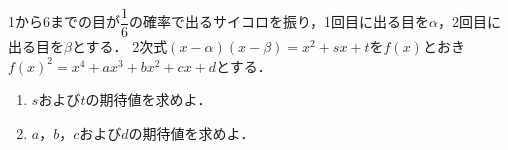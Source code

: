 \documentclass[../../main.tex]{subfiles}
\begin{document}
1から6までの目が$\displaystyle\dfrac{1}{6}$の確率で出るサイコロを振り，1回目に出る目を$\alpha$，2回目に出る目を$\beta$とする．
2次式$(x-\alpha)(x-\beta)=x^2+sx+t$を$f(x)$とおき$f(x)^2=x^4+ax^3+bx^2+cx+d$とする．
\begin{enumerate}
  \item $s$および$t$の期待値を求めよ．
  \item $a$，$b$，$c$および$d$の期待値を求めよ．
\end{enumerate}
\end{document}
